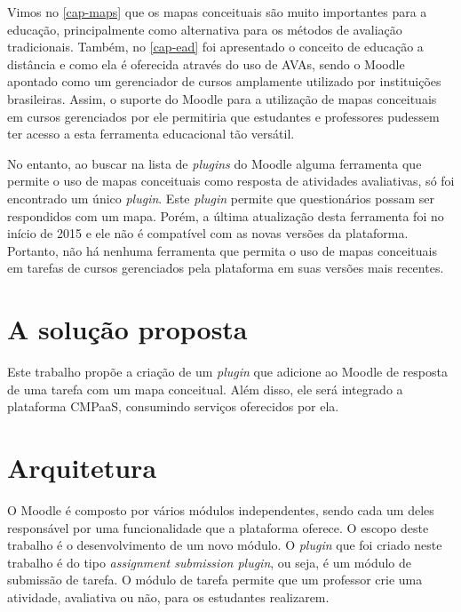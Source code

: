 \documentclass[
	12pt,				%
	openright,			%
	oneside,			%
	a4paper,			%
	english,			%
	french,				%
	spanish,			%
	brazil				%
	]{abntex2}
\begin{document}
Vimos no \autoref{cap-maps} que os mapas conceituais são muito importantes para a educação, principalmente como alternativa para os métodos de avaliação tradicionais. Também, no \autoref{cap-ead} foi apresentado o conceito de educação a distância e como ela é oferecida através do uso de AVAs, sendo o Moodle apontado como um gerenciador de cursos amplamente utilizado por instituições brasileiras. Assim, o suporte do Moodle para a utilização de mapas conceituais em cursos gerenciados por ele permitiria que estudantes e professores pudessem ter acesso a esta ferramenta educacional tão versátil.    

No entanto, ao buscar na lista de \textit{plugins} do Moodle alguma ferramenta que permite o uso de mapas conceituais como resposta de atividades avaliativas, só foi encontrado um único \textit{plugin}. Este \textit{plugin} permite que questionários possam ser respondidos com um mapa. Porém, a última atualização desta ferramenta foi no início de 2015 e ele não é compatível com as novas versões da plataforma. Portanto, não há nenhuma ferramenta que permita o uso de mapas conceituais em tarefas de cursos gerenciados pela plataforma em suas versões mais recentes.



\section{A solução proposta}

Este trabalho propõe a criação de um \textit{plugin} que adicione ao Moodle de resposta de uma tarefa com um mapa conceitual. Além disso, ele será integrado a plataforma CMPaaS, consumindo serviços oferecidos por ela.

\section{Arquitetura}

O Moodle é composto por vários módulos independentes, sendo cada um deles responsável por uma funcionalidade que a plataforma oferece. O escopo deste trabalho é o desenvolvimento de um novo módulo. O \textit{plugin} que foi criado neste trabalho é do tipo \textit{assignment submission plugin}, ou seja, é um módulo de submissão de tarefa. O módulo de tarefa permite que um professor crie uma atividade, avaliativa ou não, para os estudantes realizarem.
\end{document}
